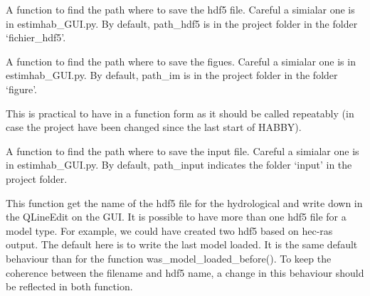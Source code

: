 \documentclass[letterpaper,10pt,english]{sphinxmanual}
\begin{document}
\begin{fulllineitems}
\begin{fulllineitems}
\label{\detokenize{index:src_GUI.hydro_GUI_2.SubHydroW.find_path_hdf5}}
A function to find the path where to save the hdf5 file. Careful a simialar one is in estimhab\_GUI.py. By default,
path\_hdf5 is in the project folder in the folder `fichier\_hdf5'.

\end{fulllineitems}


\begin{fulllineitems}
\label{\detokenize{index:src_GUI.hydro_GUI_2.SubHydroW.find_path_im}}
A function to find the path where to save the figues. Careful a simialar one is in estimhab\_GUI.py. By default,
path\_im is in the project folder in the folder `figure'.

This is practical to have in a function form as it should be called repeatably (in case the project have been
changed since the last start of HABBY).

\end{fulllineitems}


\begin{fulllineitems}
\label{\detokenize{index:src_GUI.hydro_GUI_2.SubHydroW.find_path_input}}
A function to find the path where to save the input file. Careful a simialar one is in estimhab\_GUI.py. By default,
path\_input indicates the folder `input' in the project folder.

\end{fulllineitems}


\begin{fulllineitems}
\label{\detokenize{index:src_GUI.hydro_GUI_2.SubHydroW.gethdf5_name_gui}}
This function get the name of the hdf5 file for the hydrological and write down in the QLineEdit on the GUI.
It is possible to have more than one hdf5 file for a model type. For example, we could have created two hdf5
based on hec-ras output. The default here is to write the last model loaded. It is the same default behaviour
than for the function was\_model\_loaded\_before(). To keep the coherence between the filename and hdf5 name,
a change in this behaviour should be reflected in both function.


\end{fulllineitems}
\end{fulllineitems}
\end{document}
